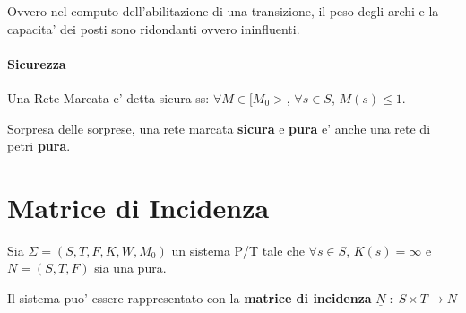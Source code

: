 Ovvero nel computo dell'abilitazione di una transizione, il peso degli archi e la capacita' dei posti sono ridondanti ovvero ininfluenti.

\paragraph{Sicurezza}

Una Rete Marcata e' detta sicura ss: $\forall M \in [M_0>$, $\forall s \in S$, $M(s) \leq 1$.

Sorpresa delle sorprese, una rete marcata \textbf{sicura} e \textbf{pura} e' anche una rete di petri \textbf{pura}.

\section{Matrice di Incidenza}

Sia $\Sigma = (S, T, F, K, W, M_0)$ un sistema P/T tale che $\forall s \in S$, $K(s) = \infty$ e $N = (S, T, F)$ sia una pura.

Il sistema puo' essere rappresentato con la \textbf{matrice di incidenza} $\underline N \; : \; S \times T \rightarrow N$
